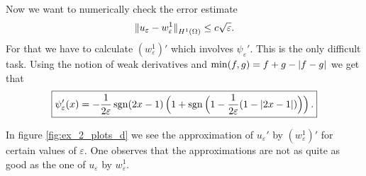 \begin{example}
	Now we want to numerically check the error estimate
	\begin{equation}
	\norm[0]{u_\varepsilon - w_\varepsilon^1}_{H^1(\Omega)} \leq c \sqrt{\varepsilon}.
	\end{equation}
	For that we have to calculate $(w_\varepsilon^1)'$ which involves $\psi_\varepsilon'$. This is the only difficult task. Using the notion of weak derivatives and $\min(f,g) = f + g - \abs[0]{f - g}$ we get that
	\begin{equation}
	\boxed{\psi_\varepsilon'(x) = -\frac{1}{2\varepsilon}\sgn(2x - 1)\del[2]{1 + \sgn\del[2]{1 - \frac{1}{2\varepsilon}(1 - \abs[0]{2x - 1})}}.}
	\end{equation}
	
	In figure \ref{fig:ex_2_plots_d} we see the approximation of $u_\varepsilon'$ by $(w_\varepsilon^1)'$ for certain values of $\varepsilon$. One observes that the approximations are not as quite as good as the one of $u_\varepsilon$ by $w_\varepsilon^1$.
	

\end{example}
